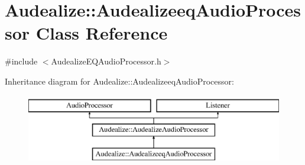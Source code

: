 \hypertarget{class_audealize_1_1_audealizeeq_audio_processor}{}\section{Audealize\+:\+:Audealizeeq\+Audio\+Processor Class Reference}
\label{class_audealize_1_1_audealizeeq_audio_processor}


{\ttfamily \#include $<$Audealize\+E\+Q\+Audio\+Processor.\+h$>$}

Inheritance diagram for Audealize\+:\+:Audealizeeq\+Audio\+Processor\+:\begin{figure}[H]
\begin{center}
\leavevmode
\includegraphics[height=3.000000cm]{class_audealize_1_1_audealizeeq_audio_processor}
\end{center}
\end{figure}
